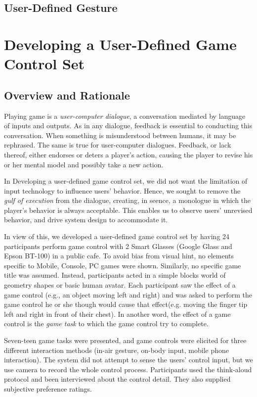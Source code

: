 \documentclass{sigchi}
\begin{document}
    \subsection{User-Defined Gesture}

\section{Developing a User-Defined Game Control Set}


    \subsection {Overview and Rationale}
    Playing game is a \textsl{user-computer dialogue}\cite{userComputer}, a conversation mediated by language of inputs and outputs. As in any dialogue, feedback is essential to conducting this conversation. When something is misunderstood between humans, it may be rephrased. The same is true for user-computer dialogues. Feedback, or lack thereof, either endorses or deters a player's action, causing the player to revise his or her mental model and possibly take a new action.

    In Developing a user-defined game control set, we did not want the limitation of input technology to influence users' behavior. Hence, we sought to remove the \textsl{gulf of execution}\cite{gulf} from the dialogue, creating, in seence, a monologue in which the player's behavior is always acceptable. This enables us to observe users' unrevised behavior, and drive system design to accommodate it.

    In view of this, we developed a user-defined game control set by having 24  participants perform game control with 2 Smart Glasses (Google Glass and Epson BT-100) in a public cafe. To avoid bias from visual hint\cite{Epps:2006:SHS:1125451.1125601}, no elements specific to Mobile, Console, PC games were shown. Similarly, no specific game title was assumed. Instead, participants acted in a simple blocks world of geometry shapes or basic human avatar. Each participant saw the effect of a game control (e.g., an object moving left and right) and was asked to perform the game control he or she though would cause that effect(e.g. moving the finger tip left and right in front of their chest). In another word, the effect of a game control is the \textsl{game task} to which the game control try to complete.

    Seven-teen game tasks were presented, and game controls were elicited for three different interaction methods (in-air gesture, on-body input, mobile phone interaction). The system did not attempt to sense the users' control input, but we use camera to record the whole control process. Participants used the think-aloud protocol and been interviewed about the control detail. They also supplied subjective preference ratings.
\end{document}
